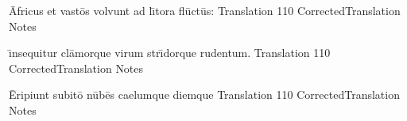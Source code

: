 \latline
  {\={\macron A}fricus et vast\={\macron o}s volvunt ad l\={\macron \i}tora fl\={\macron u}ct\={\macron u}s:
}
  { Translation }
  {110}
  { CorrectedTranslation }
  { Notes }


\latline
  {\={\macron \i}nsequitur cl\={\macron a}morque virum str\={\macron \i}dorque rudentum.
}
  { Translation }
  {110}
  { CorrectedTranslation }
  { Notes }


\latline
  {\={\macron E}ripiunt subit\={\macron o} n\={\macron u}b\={\macron e}s caelumque diemque
}
  { Translation }
  {110}
  { CorrectedTranslation }
  { Notes }


